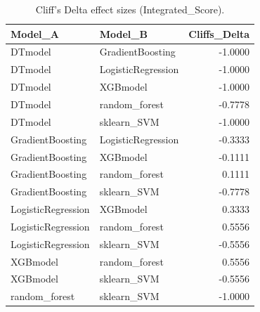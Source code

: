 \begin{table}[t]
\centering
\begin{tabular}{llr}
\toprule
Model_A & Model_B & Cliffs_Delta \\
\midrule
DTmodel & GradientBoosting & -1.0000 \\
DTmodel & LogisticRegression & -1.0000 \\
DTmodel & XGBmodel & -1.0000 \\
DTmodel & random_forest & -0.7778 \\
DTmodel & sklearn_SVM & -1.0000 \\
GradientBoosting & LogisticRegression & -0.3333 \\
GradientBoosting & XGBmodel & -0.1111 \\
GradientBoosting & random_forest & 0.1111 \\
GradientBoosting & sklearn_SVM & -0.7778 \\
LogisticRegression & XGBmodel & 0.3333 \\
LogisticRegression & random_forest & 0.5556 \\
LogisticRegression & sklearn_SVM & -0.5556 \\
XGBmodel & random_forest & 0.5556 \\
XGBmodel & sklearn_SVM & -0.5556 \\
random_forest & sklearn_SVM & -1.0000 \\
\bottomrule
\end{tabular}
\caption{Cliff's Delta effect sizes (Integrated_Score).}
\label{tab:cliffs_Integrated_Score}
\end{table}